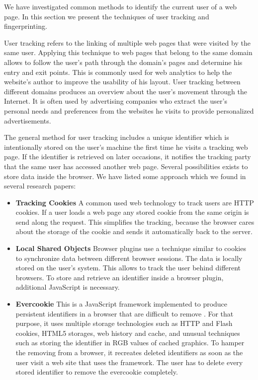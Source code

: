 	We have investigated common methods to identify the current user of a web page. In this section we present the techniques of user tracking and fingerprinting. 

	User tracking refers to the linking of multiple web pages that were visited by the same user. Applying this technique to web pages that belong to the same domain allows to follow the user's path through the domain's pages and determine his entry and exit points. This is commonly used for web analytics to help the website's author to improve the usability of his layout. User tracking between different domains produces an overview about the user's movement through the Internet. It is often used by advertising companies who extract the user's personal needs and preferences from the websites he visits to provide personalized advertisements.
		
	The general method for user tracking includes a unique identifier which is intentionally stored on the user's machine the first time he visits a tracking web page. If the identifier is retrieved on later occasions, it notifies the tracking party that the same user has accessed another web page. Several possibilities exists to store data inside the browser. We have listed some approach which we found in several research papers:
		
	\begin{itemize}
		\item \textbf{Tracking Cookies} A common used web technology to track users are HTTP cookies. If a user loads a web page any stored cookie from the same origin is send along the request. This simplifies the tracking, because the browser cares about the storage of the cookie and sends it automatically back to the server.
		
		\item \textbf{Local Shared Objects} Browser plugins use a technique similar to cookies to synchronize data between different browser sessions. The data is locally stored on the user's system. This allows to track the user behind different browsers. To store and retrieve an identifier inside a browser plugin, additional JavaScript is necessary.
		
		\item \textbf{Evercookie} This is a JavaScript framework implemented to produce persistent identifiers in a browser that are difficult to remove \cite{evercookie}. For that purpose, it uses multiple storage technologies such as HTTP and Flash cookies, HTML5 storages, web history and cache, and unusual techniques such as storing the identifier in RGB values of cached graphics. To hamper the removing from a browser, it recreates deleted identifiers as soon as the user visit a web site that uses the framework. The user has to delete every stored identifier to remove the evercookie completely. 
	\end{itemize}
	
